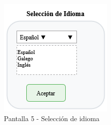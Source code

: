     \begin{figure}
        \centering
        \includegraphics{imagenes/bicifast - pantalla 5 -Seleccion de idiomadrawio}
        \caption{Pantalla 5 - Selección de idioma}
        \label{fig:bicifast---pantalla-5--seleccion-de-idiomadrawio}
    \end{figure}
%
